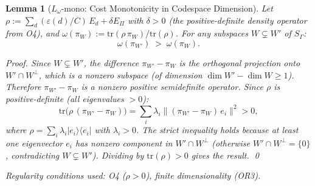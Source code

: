 \documentclass[11pt,a4paper]{article}
\newtheorem{lemma}[theorem]{Lemma}
\theoremstyle{definition}
\newcommand{\eps}{\varepsilon}
\newcommand{\tr}{\mathrm{tr}}
\begin{document}
\begin{lemma}[$L_\omega$-mono: Cost Monotonicity in Codespace Dimension]\label{lem:omega_mono}
Let $\rho := \sum_d (\eps(d)/C)\,E_d + \delta E_\Pi$ with $\delta > 0$ (the positive-definite density operator from O4), and $\omega(\pi_W) := \tr(\rho\,\pi_W)/\tr(\rho)$.  For any subspaces $W \subsetneq W'$ of $S_\Gamma$:
\[
\omega(\pi_{W'}) \;>\; \omega(\pi_W).
\]

\noindent\textit{Proof.}  Since $W \subsetneq W'$, the difference $\pi_{W'} - \pi_W$ is the orthogonal projection onto $W' \cap W^\perp$, which is a nonzero subspace (of dimension $\dim W' - \dim W \ge 1$).  Therefore $\pi_{W'} - \pi_W$ is a nonzero positive semidefinite operator.  Since $\rho$ is positive-definite (all eigenvalues $> 0$):
\[
\tr\bigl(\rho\,(\pi_{W'} - \pi_W)\bigr) = \sum_i \lambda_i \|(\pi_{W'} - \pi_W)\,e_i\|^2 > 0,
\]
where $\rho = \sum_i \lambda_i |e_i\rangle\langle e_i|$ with $\lambda_i > 0$.  The strict inequality holds because at least one eigenvector $e_i$ has nonzero component in $W' \cap W^\perp$ (otherwise $W' \cap W^\perp = \{0\}$, contradicting $W \subsetneq W'$).  Dividing by $\tr(\rho) > 0$ gives the result.  \qed

\noindent\textit{Regularity conditions used:} O4 ($\rho > 0$), finite dimensionality (OR3).
\end{lemma}
\end{document}
